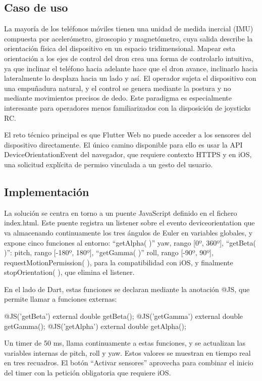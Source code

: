 \subsection{Caso de uso}
La mayoría de los teléfonos móviles tienen una unidad de medida inercial (IMU) compuesta por acelerómetro, giroscopio y magnetómetro, cuya salida describe la orientación física del dispositivo en un espacio tridimensional. Mapear esta orientación a los ejes de control del dron crea una forma de controlarlo intuitiva, ya que inclinar el teléfono hacia adelante hace que el dron avance, inclinarlo hacia lateralmente lo desplaza hacia un lado y así. El operador sujeta el dispositivo con una empuñadura natural, y el control se genera mediante la postura y no mediante movimientos precisos de dedo.
Este paradigma es especialmente interesante para operadores menos familiarizados con la disposición de joysticks RC.

El reto técnico principal es que Flutter Web no puede acceder a los sensores del dispositivo directamente. El único camino disponible para ello es usar la API DeviceOrientationEvent del navegador, que requiere contexto HTTPS y en iOS, una solicitud explícita de permiso vinculada a un gesto del usuario.

\subsection{Implementación}
La solución se centra en torno a un puente JavaScript definido en el fichero index.html. Este puente registra un listener sobre el evento deviceorientation que va almacenando continuamente los tres ángulos de Euler en variables globales, y expone cinco funciones al entorno: “getAlpha( )” yaw, rango [0º, 360º], “getBeta( )”: pitch, rango [-180º, 180º],  “getGamma( )” roll, rango [-90º, 90º],  requestMotionPermission( ), para la compatibilidad con iOS, y finalmente stopOrientation( ), que elimina el listener.

En el lado de Dart, estas funciones se declaran mediante la anotación @JS, que permite llamar a funciones externas:

@JS('getBeta')  external double getBeta();
@JS('getGamma') external double getGamma();
@JS('getAlpha') external double getAlpha();

Un timer de 50 ms, llama continuamente a estas funciones, y se actualizan las variables internas de pitch, roll y yaw. Estos valores se muestran en tiempo real en tres recuadros. El botón “Activar sensores” aprovecha para combinar el inicio del timer con la petición obligatoria que requiere iOS.

